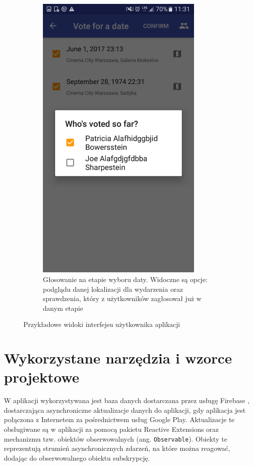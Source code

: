 \documentclass[10pt,a4paper]{article}
\begin{document}
\begin{figure}
\begin{subfigure}[t]{0.4\textwidth}
		\includegraphics[width=0.9\textwidth]{screen4.png}
		\caption{Głosowanie na etapie wyboru daty. Widoczne są opcje: podglądu danej lokalizacji
		dla wydarzenia oraz sprawdzenia, który z użytkowników zagłosował już w danym etapie}
	\end{subfigure}
	\caption{Przykładowe widoki interfejsu użytkownika aplikacji}
\end{figure}

\section{Wykorzystane narzędzia i wzorce projektowe}

W aplikacji wykorzystywana jest baza danych dostarczana przez usługę Firebase \cite{firebase},
dostarczająca asynchroniczne aktualizacje danych do aplikacji, gdy aplikacja jest połączona
z Internetem za pośrednictwem usług Google Play.
Aktualizacje te obsługiwane są w aplikacji za pomocą pakietu Reactive Extensions oraz mechanizmu
tzw. obiektów obserwowalnych (ang. \texttt{Observable}).
Obiekty te reprezentują strumień asynchronicznych zdarzeń, na które można reagować, dodając
do obserwowalnego obiektu subskrypcję.
\end{document}

